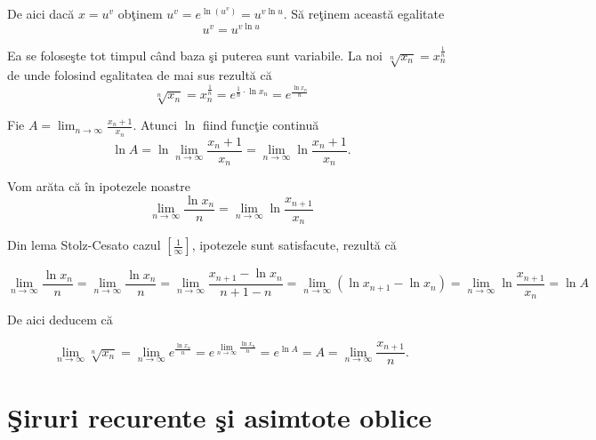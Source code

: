 \documentclass[a4paper,12pt,oneside]{report}
\begin{document}
De aici dac\u a \(x=u^{v}\) ob\c tinem \(u^{v} = e^{\ln\left ( u^{v} \right )} = u^{v\ln u}\). 
S\u a re\c tinem aceast\u a egalitate
\begin{displaymath}
  u^{v} = u^{v\ln u}
\end{displaymath}

Ea se folose\c ste tot timpul c\^ and baza \c si puterea sunt variabile. La noi  \(\sqrt[n]{x_{n}}= x_{n}^{\frac{1}{n}} \)de unde folosind egalitatea de mai sus rezult\u a c\u a 
\begin{displaymath}
  \sqrt[n]{x_{n}}= x_{n}^{\frac{1}{n}} = e^{\frac{1}{n}\cdot \ln x_{n}} = e^{\frac{\ln x_{n}}{n}}
\end{displaymath}


Fie \(A = \lim_{n \to \infty }\frac{x_{n}+1}{x_{n}}\). Atunci \(\ln\) fiind func\c tie continu\u a 
\begin{displaymath}
  \ln A = \ln \lim_{n \to \infty }\frac{x_{n}+1}{x_{n}} = \lim_{n \to \infty }\ln \frac{x_{n}+1}{x_{n}}.
\end{displaymath}


Vom ar\u ata c\u a \^ in ipotezele noastre 
\begin{displaymath}
  \lim_{n \to \infty }\frac{\ln x_{n}}{n} = \lim_{n \to \infty }\ln\frac{x_{n+1}}{x_{n}}
\end{displaymath}

 Din lema Stolz-Cesato cazul \(\left [ \frac{1}{\infty } \right ]\), ipotezele sunt satisfacute, rezult\u a c\u a 

\begin{displaymath}
  \lim_{n \to \infty }\frac{\ln x_{n}}{n} 
= \lim_{n \to \infty }\frac{\ln x_{n}}{n}  
= \lim_{n \to \infty}\frac{x_{n+1}-\ln x_{n}}{n+1-n} 
= \lim_{n \to \infty}\left ( \ln x_{n+1} - \ln x_{n} \right ) 
= \lim_{n \to \infty }\ln \frac{x_{n+1}}{x_{n}} 
= \ln A
\end{displaymath}


De aici deducem c\u a 

\begin{displaymath}
  \lim_{n \to \infty }\sqrt[n]{x_{n}} = \lim_{n \to \infty } e^{\frac{\ln x_{n}}{n}} = e^{\lim_{n \to \infty } \frac{\ln x_{n}}{n}} = e^{\ln A} = A = \lim_{n \to \infty}\frac{x_{n+1}}{n}.
\end{displaymath}

\chapter{\c Siruri recurente \c si asimtote oblice}
\end{document}
